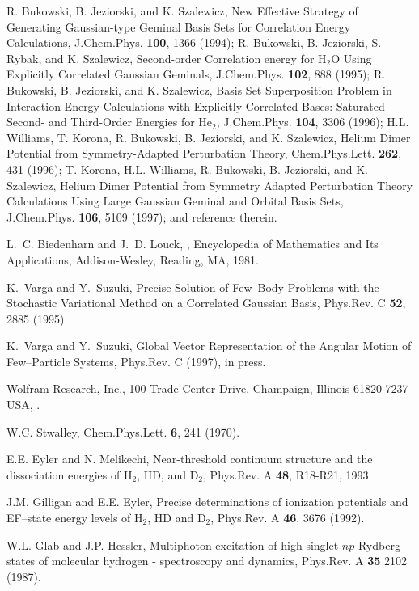 {{\begin{thebibliography}{999}
{
R. Bukowski, B. Jeziorski, and K. Szalewicz,
New Effective Strategy of Generating Gaussian-type Geminal
Basis Sets for Correlation Energy Calculations,
J.Chem.Phys. {\bf 100}, 1366 (1994);
R. Bukowski, B. Jeziorski, S. Rybak, and K. Szalewicz,
Second-order Correlation energy for H$_2$O Using
Explicitly Correlated Gaussian Geminals,
J.Chem.Phys. {\bf 102}, 888 (1995);
R. Bukowski, B. Jeziorski, and K. Szalewicz,
Basis Set Superposition Problem in Interaction Energy
Calculations with Explicitly Correlated Bases:
Saturated Second- and Third-Order Energies for He$_2$,
J.Chem.Phys. {\bf 104}, 3306 (1996);
H.L. Williams, T. Korona, R. Bukowski, B. Jeziorski, and K. Szalewicz,
Helium Dimer Potential from Symmetry-Adapted
Perturbation Theory,
Chem.Phys.Lett. {\bf 262}, 431 (1996);
T. Korona, H.L. Williams, R. Bukowski,
B. Jeziorski, and K. Szalewicz,
Helium Dimer Potential from Symmetry Adapted Perturbation Theory
Calculations Using Large Gaussian Geminal and Orbital Basis Sets,
J.Chem.Phys. {\bf 106}, 5109 (1997);
and reference therein.


L.~C. Biedenharn and J.~D. Louck,
,
\newblock Encyclopedia of Mathematics and Its Applications, Addison-{W}esley,
Reading, {MA}, 1981.

K.~Varga and Y.~Suzuki,
Precise Solution of Few--Body Problems with the
Stochastic Variational Method on a Correlated Gaussian Basis,
\newblock Phys.Rev. C {\bf 52}, 2885 (1995).


K.~Varga and Y.~Suzuki,
Global Vector Representation of the Angular Motion of
Few--Particle Systems,
\newblock Phys.Rev. C  (1997),
\newblock in press.


Wolfram Research, Inc., 
100 Trade Center Drive, Champaign, Illinois 61820-7237
USA,
.


W.C. Stwalley, Chem.Phys.Lett. {\bf 6}, 241 (1970).

E.E. Eyler and N. Melikechi, Near-threshold continuum structure
and the dissociation energies of H$_2$, HD, and D$_2$,
Phys.Rev. A {\bf 48}, R18-R21, 1993.

J.M. Gilligan and E.E. Eyler,
Precise determinations of ionization potentials and EF--state
energy levels of H$_2$, HD and D$_2$,
Phys.Rev. A {\bf 46}, 3676 (1992).

W.L. Glab and J.P. Hessler,
Multiphoton excitation of high singlet $np$ Rydberg states of
molecular hydrogen - spectroscopy and dynamics,
Phys.Rev. A {\bf 35} 2102 (1987).

}
\end{thebibliography}}}
